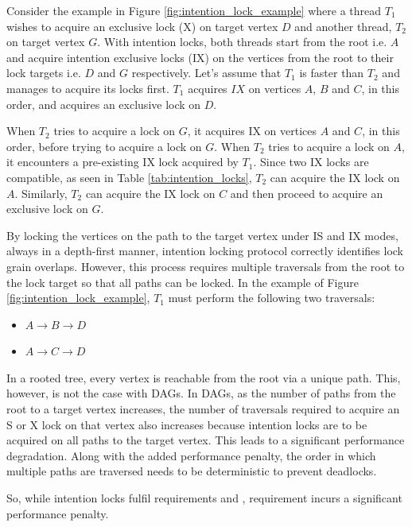 Consider the example in Figure \ref{fig:intention_lock_example} where a thread $T_1$ wishes to acquire an exclusive lock (X) on target vertex $D$ and another thread, $T_2$ on target vertex $G$. 
With intention locks, both threads start from the root i.e. $A$ and acquire intention exclusive locks (IX) on the vertices from the root to their lock targets i.e. $D$ and $G$ respectively. 
Let's assume that $T_1$ is faster than $T_2$ and manages to acquire its locks first. 
$T_1$ acquires $IX$ on vertices $A$, $B$ and $C$, in this order, and acquires an exclusive lock on $D$. 

When $T_2$ tries to acquire a lock on $G$, it acquires IX on vertices $A$ and $C$, in this order, before trying to acquire a lock on $G$. 
When $T_2$ tries to acquire a lock on $A$, it encounters a pre-existing  IX lock acquired by $T_1$. 
Since two IX locks are compatible, as seen in Table \ref{tab:intention_locks}, $T_2$ can acquire the IX lock on $A$.
Similarly, $T_2$ can acquire the IX lock on $C$ and then proceed to acquire an exclusive lock on $G$.


By locking the vertices on the path to the target vertex under IS and IX modes, always in a depth-first manner, 
intention locking protocol correctly identifies lock grain overlaps. 
However, this process requires multiple traversals from the root to the lock target so that all paths can be locked. 
In the example of Figure \ref{fig:intention_lock_example}, $T_1$ must perform the following two traversals:

\begin{itemize}
    \item $A \rightarrow B \rightarrow D$
    \item $A \rightarrow C \rightarrow D$
\end{itemize}

In a rooted tree, every vertex is reachable from the root via a unique path. 
This, however, is not the case with DAGs.
In DAGs, as the number of paths from the root to a target vertex increases, the number of traversals required to acquire an S or X lock on that vertex also increases because intention locks are to be acquired on all paths to the target vertex.
This leads to a significant performance degradation. Along with the added performance penalty, the order in which multiple paths are traversed needs to be deterministic to prevent deadlocks.  

So, while intention locks fulfil requirements \Ra and \Rb, requirement \Rc incurs a significant performance penalty. 

